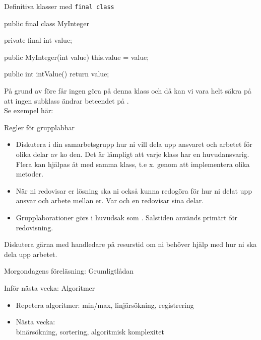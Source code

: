 \documentclass{lecturenotes}
\begin{document}
\begin{Slide}{Definitiva klasser med \texttt{final class}}
\begin{Code}
public final class MyInteger {
    private final int value;

    public MyInteger(int value) {
        this.value = value;
    }
    
    public int intValue() {
        return value;
    }
}
\end{Code}
På grund av  före  får ingen göra  på denna klass och då kan vi vara helt säkra på att ingen subklass ändrar beteendet på . \\
Se exempel här: \href{}{}
\end{Slide}


\begin{Slide}{Regler för grupplabbar}
\begin{itemize}
\item Diskutera i din samarbetsgrupp hur ni vill dela upp ansvaret och arbetet för olika delar av ko
den. Det är lämpligt att varje klass har en huvudansvarig. Flera kan hjälpas åt med samma klass, t.e
x. genom att implementera olika metoder.
\item När ni redovisar er lösning ska ni också kunna redogöra för hur ni delat upp ansvar och arbete
 mellan er. Var och en redovisar sina delar.
\item Grupplaborationer görs i huvudsak som . Salstiden används primärt för redovisning.
\end{itemize}
Diskutera gärna med handledare på resurstid om ni behöver hjälp med hur ni ska dela upp arbetet.
\end{Slide}

\begin{Slide}{Morgondagens föreläsning: Grumligtlådan}
\end{Slide}

\begin{Slide}{Inför nästa vecka: Algoritmer}
\begin{itemize}
\item Repetera algoritmer: min/max, linjärsökning, registrering
\item Nästa vecka: \\ binärsökning, sortering, algoritmisk komplexitet
\end{itemize}
\end{Slide}
\end{document}
